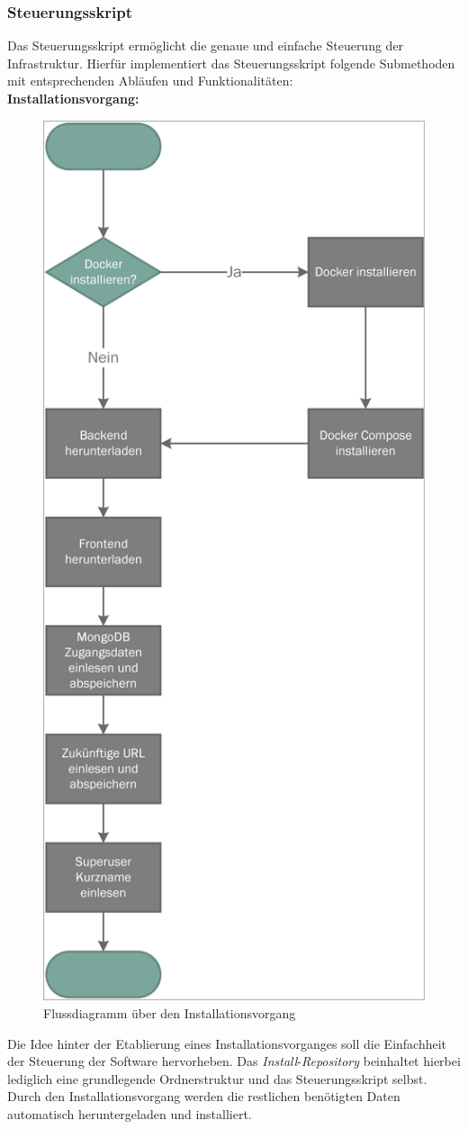 \newpage

\subsubsection{Steuerungsskript}

Das Steuerungsskript ermöglicht die genaue und einfache Steuerung der Infrastruktur.
Hierfür implementiert das Steuerungsskript folgende Submethoden mit entsprechenden Abläufen und Funktionalitäten:\\

\textbf{Installationsvorgang:}

\begin{figure}[H]
	\centering
	\includegraphics[width=0.5\linewidth]{images/mbeier_konzept/Install_border}
	\caption[Flussdiagramm über den Installationsvorgang]{Flussdiagramm über den Installationsvorgang}
	\label{fig:install}
\end{figure}

\newpage

Die Idee hinter der Etablierung eines Installationsvorganges soll die Einfachheit der Steuerung der Software hervorheben. Das \textit{Install}-\textit{Repository} beinhaltet hierbei lediglich eine grundlegende Ordnerstruktur und das Steuerungsskript selbst. Durch den Installationsvorgang werden die restlichen benötigten Daten automatisch heruntergeladen und installiert.


